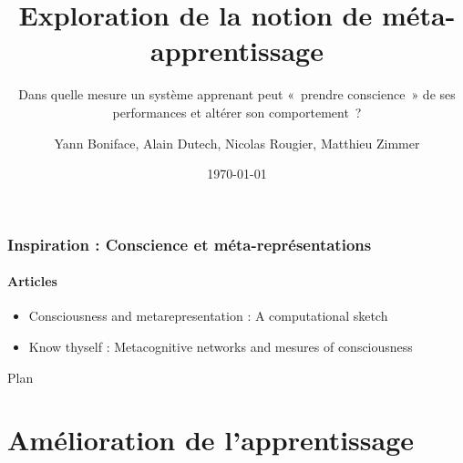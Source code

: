 \documentclass[11pt]{beamer}
\author{Yann Boniface, Alain Dutech, Nicolas Rougier, Matthieu Zimmer}
\title{Exploration de la notion de méta-apprentissage}
\subtitle[\ldots]{Dans quelle mesure un système apprenant peut « prendre conscience » de ses performances et altérer son comportement ?}
\institute{Loria}
\date{\today}
\begin{document}
\maketitle



\begin{frame}\transwipe
 \frametitle{Inspiration : Conscience et méta-représentations}
 \framesubtitle{Articles}
 
 \begin{itemize}
  \item Consciousness and metarepresentation : A computational sketch
  \item Know thyself : Metacognitive networks and mesures of consciousness
 \end{itemize}
\end{frame}



\begin{frame}\transwipe
  \begin{center}{\Large Plan }\end{center}
  \tableofcontents[hideallsubsections]
\end{frame}

\section{Amélioration de l'apprentissage}
\end{document}

